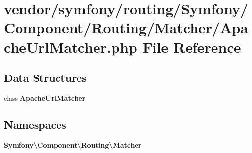\section{vendor/symfony/routing/\+Symfony/\+Component/\+Routing/\+Matcher/\+Apache\+Url\+Matcher.php File Reference}
\label{_apache_url_matcher_8php}
\subsection*{Data Structures}
\begin{DoxyCompactItemize}
\item 
class {\bf Apache\+Url\+Matcher}
\end{DoxyCompactItemize}
\subsection*{Namespaces}
\begin{DoxyCompactItemize}
\item 
 {\bf Symfony\textbackslash{}\+Component\textbackslash{}\+Routing\textbackslash{}\+Matcher}
\end{DoxyCompactItemize}
